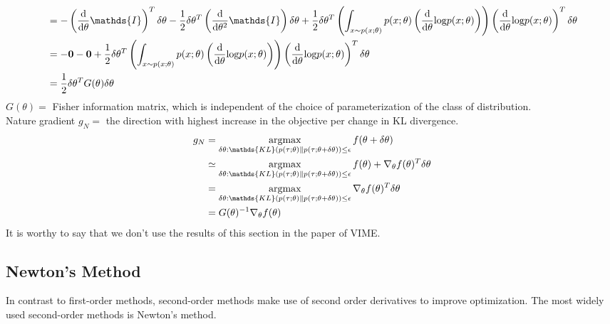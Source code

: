\documentclass{article}
\begin{document}
\begin{align}
	 &= -\left(\frac{\text{d}}{\text{d}\theta}\mathds{I}\right)^T\delta\theta - \frac{1}{2}\delta\theta^T\left(\frac{\text{d}}{\text{d}\theta^2}\mathds{I}\right)\delta\theta + \frac{1}{2}\delta\theta^T\left(\int_{x\sim p(x;\theta)}p(x;\theta)\left(\frac{\text{d}}{\text{d}\theta}\text{log}p(x;\theta)\right)\right)\left(\frac{\text{d}}{\text{d}\theta}\text{log}p(x;\theta)\right)^T\delta\theta\notag\\
	 &= -\mathbf{0-0}+ \frac{1}{2}\delta\theta^T\left(\int_{x\sim p(x;\theta)}p(x;\theta)\left(\frac{\text{d}}{\text{d}\theta}\text{log}p(x;\theta)\right)\right)\left(\frac{\text{d}}{\text{d}\theta}\text{log}p(x;\theta)\right)^T\delta\theta\notag\\
	 &= \frac{1}{2}\delta\theta^TG(\theta)\delta\theta
	 \end{align}
	 $G(\theta)=$ Fisher information matrix, which is independent of the choice of parameterization of the class of distribution.\\
	 \noindent Nature gradient  $g_N = $ the direction with highest increase in the objective per change in KL divergence.
	 \begin{align}
	 g_N &= \mathop{\text{argmax}}\limits_{\delta\theta:\mathds{KL}(p(\tau;\theta)\|p(\tau;\theta + \delta\theta))\leq \epsilon}f(\theta + \delta\theta)\notag\\
	 &\simeq \mathop{\text{argmax}}\limits_{\delta\theta:\mathds{KL}(p(\tau;\theta)\|p(\tau;\theta + \delta\theta))\leq \epsilon}f(\theta) + \nabla_{\theta}f(\theta)^T\delta\theta\notag\\
	 &= \mathop{\text{argmax}}\limits_{\delta\theta:\mathds{KL}(p(\tau;\theta)\|p(\tau;\theta + \delta\theta))\leq \epsilon}\nabla_{\theta}f(\theta)^T\delta\theta\notag\\
	 &= G(\theta)^{-1}\nabla_\theta f(\theta)
	 \end{align} 
	 It is worthy to say that we don't use the results of this section in the paper of VIME.
	 \subsection{Newton's Method}
	 In contrast to first-order methods, second-order methods make use of second order derivatives to improve optimization. The most widely used second-order methods is Newton's method. 
	 
\end{document}
